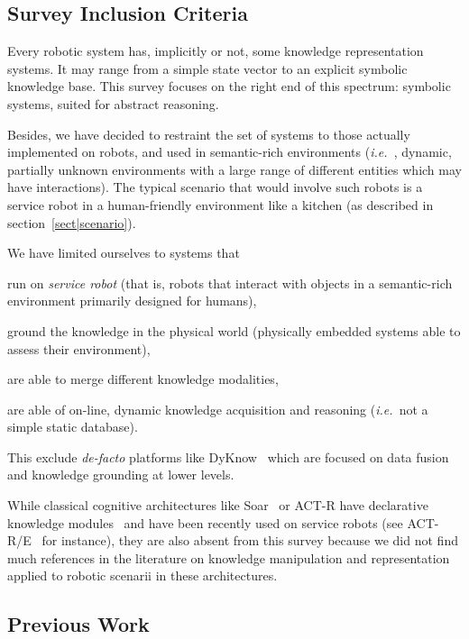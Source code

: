 \documentclass[a4paper, twocolumn]{article}
\newcommand{\ie}{{\textit{i.e.~}}}
\begin{document}
\subsection*{Survey Inclusion Criteria}
\label{sect|inclusion-criteria}

Every robotic system has, implicitly or not, some knowledge representation
systems. It may range from a simple state vector to an explicit symbolic
knowledge base.  This survey focuses on the right end of this spectrum:
symbolic systems, suited for abstract reasoning.

Besides, we have decided to restraint the set of systems to those actually
implemented on robots, and used in semantic-rich environments (\ie , dynamic,
partially unknown environments with a large range of different entities which
may have interactions). The typical scenario that would involve such robots is
a service robot in a human-friendly environment like a kitchen (as described in
section~\ref{sect|scenario}).

We have limited ourselves to systems that
\begin{inparaenum} 
    \item  run on \emph{service robot} (that is, robots that interact with 
    objects in a semantic-rich environment primarily designed for humans),
    \item  ground the knowledge in the physical world (physically embedded
    systems able to assess their environment),
    \item  are able to merge different knowledge modalities,
    \item  are able of on-line, dynamic knowledge acquisition and reasoning 
    (\ie not a simple static database).
\end{inparaenum}

This exclude \textit{de-facto} platforms like {\sc DyKnow}~\cite{Heintz2004}
which are focused on data fusion and knowledge grounding at lower levels.

While classical cognitive architectures like {\sc Soar}~\cite{Lehman2006} or
{\sc ACT-R} have declarative knowledge modules~\cite{Derbinsky2010} and have
been recently used on service robots (see {\sc ACT-R/E}~\cite{Kennedy2009} for
instance), they are also absent from this survey because we did not find much
references in the literature on knowledge manipulation and representation
applied to robotic scenarii in these architectures.

\subsection{Previous Work}
\label{sect|evaluation-literature}
\end{document}
